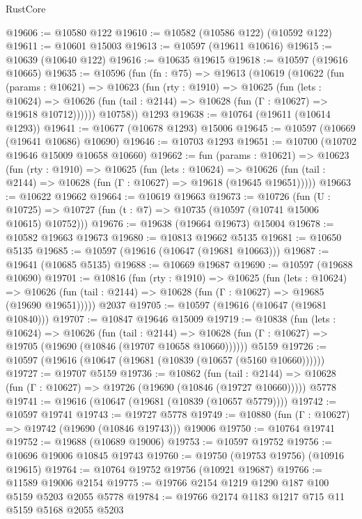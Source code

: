 \begin{lexlean}{RustCore}
\begin{coremodule}
@19606 := @10580 @122
@19610 := @10582 (@10586 @122) (@10592 @122)
@19611 := @10601 @15003
@19613 := @10597 (@19611 @10616)
@19615 := @10639 (@10640 @122)
@19616 := @10635 @19615
@19618 := @10597 (@19616 @10665)
@19635 := @10596
    (fun (fn : @75) =>
    @19613
      (@10619
        (@10622
          (fun (params : @10621) =>
          @10623
            (fun (rty : @1910) =>
            @10625
              (fun (lets : @10624) =>
              @10626 (fun (tail : @2144) => @10628 (fun (Γ : @10627) => @19618 @10712))))))
        @10758))
    @1293
@19638 := @10764 (@19611 (@10614 @1293))
@19641 := @10677 (@10678 @1293) @15006
@19645 := @10597 (@10669 (@19641 @10686) @10690)
@19646 := @10703 @1293
@19651 := @10700 (@10702 @19646 @15009 @10658 @10660)
@19662 := fun (params : @10621) =>
  @10623
    (fun (rty : @1910) =>
    @10625
      (fun (lets : @10624) =>
      @10626 (fun (tail : @2144) => @10628 (fun (Γ : @10627) => @19618 (@19645 @19651)))))
@19663 := @10622 @19662
@19664 := @10619 @19663
@19673 := @10726
    (fun (U : @10725) => @10727 (fun (t : @7) => @10735 (@10597 (@10741 @15006 @10615) @10752)))
@19676 := @19638 (@19664 @19673) @15004
@19678 := @10582 @19663 @19673
@19680 := @10813 @19662 @5135
@19681 := @10650 @5135
@19685 := @10597 (@19616 (@10647 (@19681 @10663)))
@19687 := @19641 (@10685 @5135)
@19688 := @10669 @19687
@19690 := @10597 (@19688 @10690)
@19701 := @10816
    (fun (rty : @1910) =>
    @10625
      (fun (lets : @10624) =>
      @10626 (fun (tail : @2144) => @10628 (fun (Γ : @10627) => @19685 (@19690 @19651)))))
    @2037
@19705 := @10597 (@19616 (@10647 (@19681 @10840)))
@19707 := @10847 @19646 @15009
@19719 := @10838
    (fun (lets : @10624) =>
    @10626
      (fun (tail : @2144) =>
      @10628 (fun (Γ : @10627) => @19705 (@19690 (@10846 (@19707 @10658 @10660))))))
    @5159
@19726 := @10597 (@19616 (@10647 (@19681 (@10839 (@10657 (@5160 @10660))))))
@19727 := @19707 @5159
@19736 := @10862
    (fun (tail : @2144) => @10628 (fun (Γ : @10627) => @19726 (@19690 (@10846 (@19727 @10660)))))
    @5778
@19741 := @19616 (@10647 (@19681 (@10839 (@10657 @5779))))
@19742 := @10597 @19741
@19743 := @19727 @5778
@19749 := @10880 (fun (Γ : @10627) => @19742 (@19690 (@10846 @19743))) @19006
@19750 := @10764 @19741
@19752 := @19688 (@10689 @19006)
@19753 := @10597 @19752
@19756 := @10696 @19006 @10845 @19743
@19760 := @19750 (@19753 @19756) (@10916 @19615)
@19764 := @10764 @19752 @19756 (@10921 @19687)
@19766 := @11589 @19006 @2154
@19775 := @19766 @2154 @1219 @1290 @187 @100 @5159 @5203 @2055 @5778
@19784 := @19766 @2174 @1183 @1217 @715 @11 @5159 @5168 @2055 @5203

\end{coremodule}
\end{lexlean}
